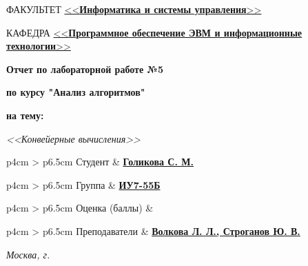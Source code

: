 \begin{titlepage}
	\begin{flushleft}
		\fontsize{12pt}{0.8\baselineskip}\selectfont 
		
		ФАКУЛЬТЕТ \uline{<<\textbf{Информатика и системы управления}>> \hfill}
		
		КАФЕДРА \uline{\mbox{\hspace{4mm}} <<\textbf{Программное обеспечение ЭВМ и информационные технологии}>> \hfill}
	\end{flushleft}

	\vfill

	\begin{center}
		\fontsize{20pt}{\baselineskip}\selectfont

		\textbf{Отчет по лабораторной работе №5}

		\textbf{по курсу "Анализ алгоритмов"}

		\textbf{на тему:}
	\end{center}

	\begin{center}
		\fontsize{18pt}{0.6cm}\selectfont 
		
			\textit{<<Конвейерные вычисления>>}
		
	\end{center}

	\vfill

	\begin{table}[h!]
		\fontsize{12pt}{0.7\baselineskip}\selectfont
		
		\begin{signstabular}[0.55]{p{4cm} > {\centering\arraybackslash}p{6.5cm}}
				Студент & \uline{\textbf{Голикова С. М.} \hfill} 
		\end{signstabular}
		
		\begin{signstabular}[0.55]{p{4cm} > {\centering\arraybackslash}p{6.5cm}}
				Группа & \uline{\textbf{ИУ7-55Б} \hfill} 
		\end{signstabular}
		
		\begin{signstabular}[0.55]{p{4cm} > {\centering\arraybackslash}p{6.5cm}}
				Оценка (баллы) & \uline{\mbox{\hspace*{6.5cm}}} 
		\end{signstabular}
		
		\begin{signstabular}[0.55]{p{4cm} > {\centering\arraybackslash}p{6.5cm}}
				Преподаватели & \uline{\textbf{Волкова Л. Л., Строганов Ю. В.} \hfill}
		\end{signstabular}
	\end{table}
	
	\vfill

	\begin{center}
		\normalsize \textit{Москва, \the\year г.}
	\end{center}
\end{titlepage}